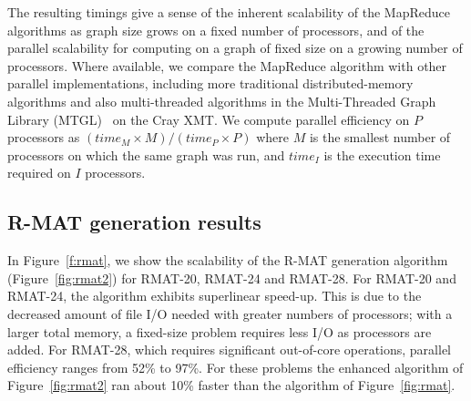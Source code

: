 The resulting timings give a sense of the inherent scalability of the
MapReduce algorithms as graph size grows on a fixed number of
processors, and of the parallel scalability for computing on a graph
of fixed size on a growing number of processors.  Where available, we
compare the MapReduce algorithm with other parallel implementations,
including more traditional distributed-memory algorithms and also
multi-threaded algorithms in the Multi-Threaded Graph Library
(MTGL)~\cite{MTGL} on the Cray XMT.  We compute parallel efficiency on
$P$ processors as $({time}_{M} \times M) / ({time}_P \times P)$ where
$M$ is the smallest number of processors on which the same graph was
run, and ${time}_I$ is the execution time required on $I$ processors.

\subsection{R-MAT generation results}

In Figure~\ref{f:rmat}, we show the scalability of the R-MAT
generation algorithm (Figure~\ref{fig:rmat2}) for RMAT-20, RMAT-24 and
RMAT-28.  For RMAT-20 and RMAT-24, the algorithm exhibits superlinear
speed-up.  This is due to the decreased amount of file I/O needed with
greater numbers of processors; with a larger total memory, a
fixed-size problem requires less I/O as processors are added.  For
RMAT-28, which requires significant out-of-core operations, parallel
efficiency ranges from 52\% to 97\%.  For these problems the enhanced
algorithm of Figure~\ref{fig:rmat2} ran about 10\% faster than the
algorithm of Figure~\ref{fig:rmat}.


